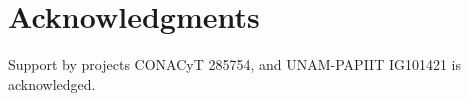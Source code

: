 \documentclass[10pt,letterpaper]{article} %
\begin{document}
% 
% 
% 
% 
% 
\section{Acknowledgments} %
Support by projects CONACyT 285754, and UNAM-PAPIIT IG101421 is acknowledged. 
\end{document}
